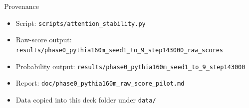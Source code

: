 \documentclass[aspectratio=169]{beamer}
\begin{document}
\begin{frame}{Provenance}
  \begin{itemize}
    \item Script: \texttt{scripts/attention\_stability.py}
    \item Raw-score output: \texttt{results/phase0\_pythia160m\_seed1\_to\_9\_step143000\_raw\_scores}
    \item Probability output: \texttt{results/phase0\_pythia160m\_seed1\_to\_9\_step143000}
    \item Report: \texttt{doc/phase0\_pythia160m\_raw\_score\_pilot.md}
    \item Data copied into this deck folder under \texttt{data/}
  \end{itemize}
\end{frame}
\end{document}
